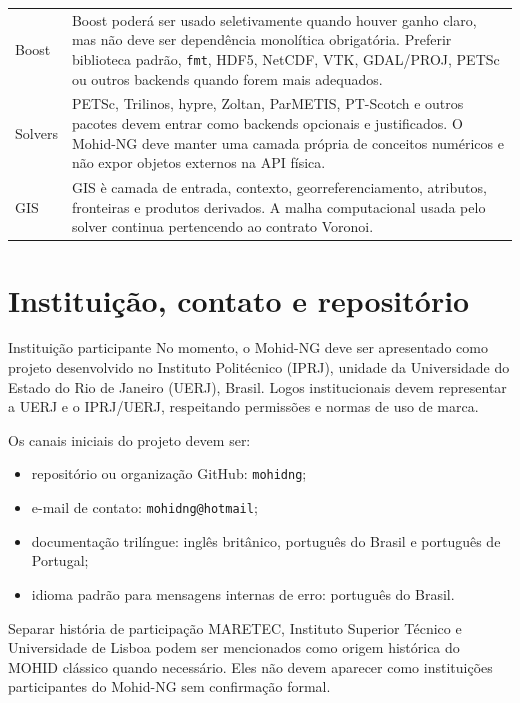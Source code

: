 \documentclass[11pt,a4paper]{article}
\begin{document}
\begin{longtable}{p{}p{}}
\addlinespace
Boost & Boost poder\'a ser usado seletivamente quando houver ganho claro, mas n\~ao deve ser depend\^encia monol\'itica obrigat\'oria. Preferir biblioteca padr\~ao, \texttt{fmt}, HDF5, NetCDF, VTK, GDAL/PROJ, PETSc ou outros backends quando forem mais adequados.\tabularnewline
\addlinespace
Solvers & PETSc, Trilinos, hypre, Zoltan, ParMETIS, PT-Scotch e outros pacotes devem entrar como backends opcionais e justificados. O Mohid-NG deve manter uma camada pr\'opria de conceitos num\'ericos e n\~ao expor objetos externos na API f\'isica.\tabularnewline
\addlinespace
GIS & GIS \`e camada de entrada, contexto, georreferenciamento, atributos, fronteiras e produtos derivados. A malha computacional usada pelo solver continua pertencendo ao contrato Voronoi.\tabularnewline
\bottomrule
\end{longtable}

\section{Institui\c{c}\~ao, contato e reposit\'orio}

\begin{principlebox}{Institui\c{c}\~ao participante}
No momento, o Mohid-NG deve ser apresentado como projeto desenvolvido no Instituto Polit\'ecnico (IPRJ), unidade da Universidade do Estado do Rio de Janeiro (UERJ), Brasil. Logos institucionais devem representar a UERJ e o IPRJ/UERJ, respeitando permiss\~oes e normas de uso de marca.
\end{principlebox}

Os canais iniciais do projeto devem ser:
\begin{itemize}
  \item reposit\'orio ou organiza\c{c}\~ao GitHub: \texttt{mohidng};
  \item e-mail de contato: \texttt{mohidng@hotmail};
  \item documenta\c{c}\~ao tril\'ingue: ingl\^es brit\^anico, portugu\^es do Brasil e portugu\^es de Portugal;
  \item idioma padr\~ao para mensagens internas de erro: portugu\^es do Brasil.
\end{itemize}

\begin{warningbox}{Separar hist\'oria de participa\c{c}\~ao}
MARETEC, Instituto Superior T\'ecnico e Universidade de Lisboa podem ser mencionados como origem hist\'orica do MOHID cl\'assico quando necess\'ario. Eles n\~ao devem aparecer como institui\c{c}\~oes participantes do Mohid-NG sem confirma\c{c}\~ao formal.
\end{warningbox}
\end{document}
